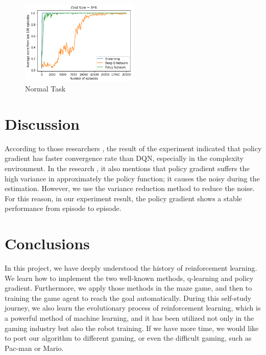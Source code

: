 \documentclass[article]{aaltoseries}
\begin{document}
\begin{figure}[t!]
  \begin{center}
    \includegraphics[width=0.5\textwidth]{figures/normal}
    \caption{Normal Task}
    \label{fig:mypicture1}
  \end{center}
\end{figure}




\section{Discussion}

According to those researchers \cite{DBLP:journals/corr/SchulmanAC17, deepcompareurl}, the result of the experiment indicated that policy gradient has faster convergence rate than DQN, especially in the complexity environment. In the research \cite{deepcompareurl}, it also mentions that policy gradient suffers the high variance in approximately the policy function; it causes the noisy during the estimation. However, we use the variance reduction method to reduce the noise. For this reason, in our experiment result, the policy gradient shows a stable performance from episode to episode.



\section{Conclusions}

In this project, we have deeply understood the history of reinforcement learning. We learn how to implement the two well-known methods, q-learning and policy gradient. Furthermore, we apply those methods in the maze game, and then to training the game agent to reach the goal automatically. During this self-study journey, we also learn the evolutionary process of reinforcement learning, which is a powerful method of machine learning, and it has been utilized not only in the gaming industry but also the robot training. If we have more time, we would like to port our algorithm to different gaming, or even the difficult gaming, such as Pac-man or Mario.
\end{document}
